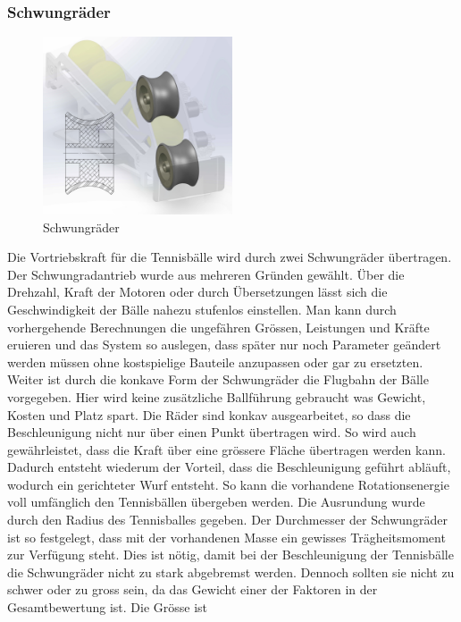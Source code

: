 \subsubsection{Schwungräder}
\begin{figure}
	\centering
	\includegraphics[width=0.5\textwidth]{Enddokumentation/Loesungskonzept/Bilder/Schwungraeder.jpg}
	\caption{Schwungräder}
	\label{fig:Schwungräder}	
\end{figure}
Die Vortriebskraft für die Tennisbälle wird durch zwei Schwungräder übertragen. Der
Schwungradantrieb wurde aus mehreren Gründen gewählt. Über die Drehzahl, Kraft der Motoren oder
durch Übersetzungen lässt sich die Geschwindigkeit der Bälle nahezu stufenlos einstellen. Man kann
durch vorhergehende Berechnungen die ungefähren Grössen, Leistungen und Kräfte eruieren und das
System so auslegen, dass später nur noch Parameter geändert werden müssen ohne kostspielige Bauteile
anzupassen oder gar zu ersetzten. Weiter ist durch die konkave Form der Schwungräder die Flugbahn
der Bälle vorgegeben. Hier wird keine zusätzliche Ballführung gebraucht was Gewicht, Kosten und
Platz spart. Die Räder sind konkav ausgearbeitet, so dass die Beschleunigung nicht nur über einen
Punkt übertragen wird. So wird auch gewährleistet, dass die Kraft über eine grössere Fläche
übertragen werden kann. Dadurch entsteht wiederum der Vorteil, dass die Beschleunigung geführt
abläuft, wodurch ein gerichteter Wurf entsteht. So kann die vorhandene Rotationsenergie voll
umfänglich den Tennisbällen übergeben werden. Die Ausrundung wurde durch den Radius des Tennisballes
gegeben. Der Durchmesser der Schwungräder ist so festgelegt, dass mit der vorhandenen Masse ein
gewisses Trägheitsmoment zur Verfügung steht. Dies ist nötig, damit bei der Beschleunigung der
Tennisbälle die Schwungräder nicht zu stark abgebremst werden. Dennoch sollten sie nicht zu schwer
oder zu gross sein, da das Gewicht einer der Faktoren in der Gesamtbewertung ist. Die Grösse ist
